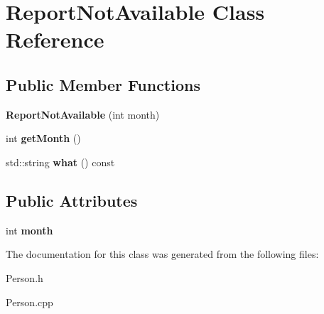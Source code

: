 \hypertarget{class_report_not_available}{}\section{Report\+Not\+Available Class Reference}
\label{class_report_not_available}
\subsection*{Public Member Functions}
\begin{DoxyCompactItemize}
\item 
\mbox{\label{class_report_not_available_af8c20e04e062f7922f5507ca31d37854}} 
{\bfseries Report\+Not\+Available} (int month)
\item 
\mbox{\label{class_report_not_available_a64bf230892d4e34fecb8143d04b95d02}} 
int {\bfseries get\+Month} ()
\item 
\mbox{\label{class_report_not_available_a2139ebc44990ab772c6e56d0a0d71e7d}} 
std\+::string {\bfseries what} () const
\end{DoxyCompactItemize}
\subsection*{Public Attributes}
\begin{DoxyCompactItemize}
\item 
\mbox{\label{class_report_not_available_a11686bc53e58de31838b14e6a23ec0c6}} 
int {\bfseries month}
\end{DoxyCompactItemize}


The documentation for this class was generated from the following files\+:\begin{DoxyCompactItemize}
\item 
Person.\+h\item 
Person.\+cpp\end{DoxyCompactItemize}
